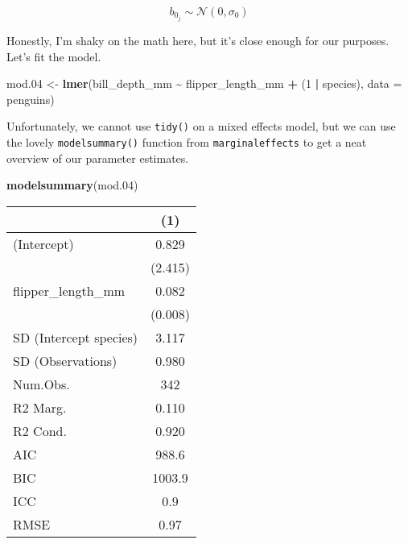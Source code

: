 \documentclass[
]{article}
\newenvironment{Shaded}{\begin{snugshade}}{\end{snugshade}}
\newcommand{\AttributeTok}[1]{\textcolor[rgb]{0.13,0.29,0.53}{#1}}
\newcommand{\DecValTok}[1]{\textcolor[rgb]{0.00,0.00,0.81}{#1}}
\newcommand{\FloatTok}[1]{\textcolor[rgb]{0.00,0.00,0.81}{#1}}
\newcommand{\FunctionTok}[1]{\textcolor[rgb]{0.13,0.29,0.53}{\textbf{#1}}}
\newcommand{\NormalTok}[1]{#1}
\newcommand{\OtherTok}[1]{\textcolor[rgb]{0.56,0.35,0.01}{#1}}
\newcommand{\SpecialCharTok}[1]{\textcolor[rgb]{0.81,0.36,0.00}{\textbf{#1}}}
\begin{document}
\[b_{0_j} \sim \mathcal{N}(0, \sigma_0)\]

Honestly, I'm shaky on the math here, but it's close enough for our
purposes. Let's fit the model.

\begin{Shaded}
\begin{Highlighting}[]
\NormalTok{mod}\FloatTok{.04} \OtherTok{\textless{}{-}} \FunctionTok{lmer}\NormalTok{(bill\_depth\_mm }\SpecialCharTok{\textasciitilde{}}\NormalTok{ flipper\_length\_mm }\SpecialCharTok{+}\NormalTok{ (}\DecValTok{1} \SpecialCharTok{|}\NormalTok{ species),}
               \AttributeTok{data =}\NormalTok{ penguins)}
\end{Highlighting}
\end{Shaded}

Unfortunately, we cannot use \texttt{tidy()} on a mixed effects model,
but we can use the lovely \texttt{modelsummary()} function from
\texttt{marginaleffects} to get a neat overview of our parameter
estimates.

\begin{Shaded}
\begin{Highlighting}[]
\FunctionTok{modelsummary}\NormalTok{(mod}\FloatTok{.04}\NormalTok{)}
\end{Highlighting}
\end{Shaded}

\begin{table}
\centering
\begin{tabular}[t]{lc}
\toprule
  & (1)\\
\midrule
(Intercept) & \num{0.829}\\
 & (\num{2.415})\\
flipper\_length\_mm & \num{0.082}\\
 & (\num{0.008})\\
SD (Intercept species) & \num{3.117}\\
SD (Observations) & \num{0.980}\\
\midrule
Num.Obs. & \num{342}\\
R2 Marg. & \num{0.110}\\
R2 Cond. & \num{0.920}\\
AIC & \num{988.6}\\
BIC & \num{1003.9}\\
ICC & \num{0.9}\\
RMSE & \num{0.97}\\
\bottomrule
\end{tabular}
\end{table}
\end{document}
